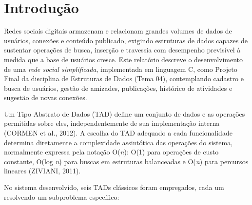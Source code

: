 \documentclass[
	12pt,				%
	oneside,			%
	a4paper,			%
	chapter=TITLE,		%
	brazil,				%
	]{abntex2}
\begin{document}
\frenchspacing

\pretextual

\imprimircapa

\tableofcontents*
\clearpage

\textual

\chapter{Introdução}

Redes sociais digitais armazenam e relacionam grandes volumes de dados de
usuários, conexões e conteúdo publicado, exigindo estruturas de dados
capazes de sustentar operações de busca, inserção e travessia com
desempenho previsível à medida que a base de usuários cresce. Este
relatório descreve o desenvolvimento de uma \emph{rede social simplificada},
implementada em linguagem C, como Projeto Final da disciplina de Estruturas
de Dados (Tema 04), contemplando cadastro e busca de usuários, gestão de
amizades, publicações, histórico de atividades e sugestão de novas
conexões.

Um Tipo Abstrato de Dados (TAD) define um conjunto de dados e as operações
permitidas sobre eles, independentemente de sua implementação interna
(CORMEN et al., 2012). A escolha do TAD adequado a cada funcionalidade
determina diretamente a complexidade assintótica das operações do sistema,
normalmente expressa pela notação O(\emph{n}): O(1) para operações de custo
constante, O(log \emph{n}) para buscas em estruturas balanceadas e O(\emph{n})
para percursos lineares (ZIVIANI, 2011).

No sistema desenvolvido, seis TADs clássicos foram empregados, cada um
resolvendo um subproblema específico:
\end{document}
